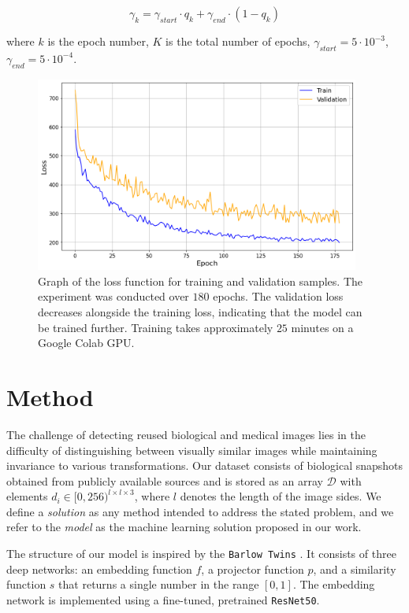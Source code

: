 \documentclass{article}
\begin{document}
$$ \gamma_{k} = \gamma_{start} \cdot q_k + \gamma_{end} \cdot (1 - q_k) $$

where $k$ is the epoch number, $K$ is the total number of epochs, 
$\gamma_{start} = 5 \cdot 10^{-3}$, $\gamma_{end} = 5 \cdot 10^{-4}$. 

\begin{figure}[htbp]
    \centering
    \includegraphics[width=0.95\textwidth]{figures/BT_blood-cells-256_experiment.png}
    \caption{Graph of the loss function for training and validation samples. 
    The experiment was conducted over $180$ epochs. 
    The validation loss decreases alongside the training loss, indicating that 
    the model can be trained further. 
    Training takes approximately $25$ minutes on a Google Colab GPU. 
    }
    \label{fig:experiment}
\end{figure}

\section{Method}

The challenge of detecting reused biological and medical images lies in the difficulty of
distinguishing between visually similar images while maintaining invariance to various 
transformations. Our dataset consists of biological snapshots obtained from publicly available 
sources and is stored as an array $\mathcal{D}$ with elements $d_i \in [0, 256)^{l \times l 
\times 3}$, where $l$ denotes the length of the image sides. We define a \textit{solution} as 
any method intended to address the stated problem, and we refer to the \textit{model} as the 
machine learning solution proposed in our work.

The structure of our model is inspired by the \texttt{Barlow Twins} \cite{zbontar2021barlow}. 
It consists of three deep networks: an embedding function $f$, a projector function $p$, 
and a similarity function $s$ that returns a single number in the range $[0,1]$. 
The embedding network is implemented using a fine-tuned, pretrained \texttt{ResNet50}.
\end{document}
